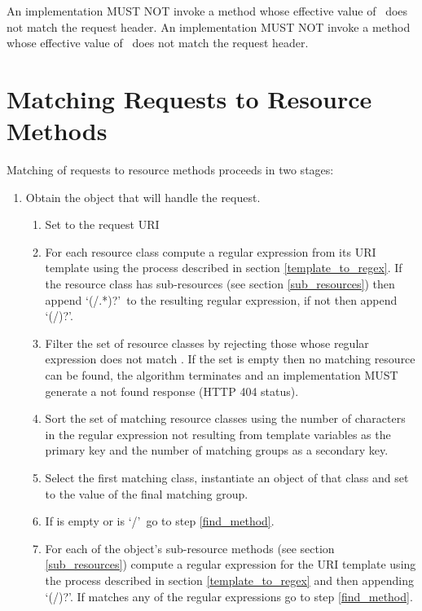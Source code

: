 An implementation MUST NOT invoke a method whose effective value of \ProduceMime\ does not match the request  header. An implementation MUST NOT invoke a method whose effective value of \ConsumeMime\ does not match the request  header.

\section{Matching Requests to Resource Methods}
\label{mapping_requests_to_java_methods}

Matching of requests to resource methods proceeds in two stages:

\begin{enumerate}
\item Obtain the object that will handle the request.

\begin{enumerate}
\item Set  to the request URI

\item For each resource class compute a regular expression from its URI template using the process described in section \ref{template_to_regex}. If the resource class has sub-resources (see section \ref{sub_resources}) then append \lq(/.*)?\rq\ to the resulting regular expression, if not then append \lq(/)?\rq.

\item Filter the set of resource classes by rejecting those whose regular expression does not match . If the set is empty then no matching resource can be found, the algorithm terminates and an implementation MUST generate a not found response (HTTP 404 status).

\item Sort the set of matching resource classes using the number of characters in the regular expression not resulting from template variables as the primary key and the number of matching groups as a secondary key.

\item Select the first matching class, instantiate an object of that class and set  to the value of the final matching group.

\item\label{check_uri} If  is empty or is \lq/\rq\ go to step \ref{find_method}.

\item For each of the object's sub-resource methods (see section \ref{sub_resources}) compute a regular expression for the URI template using the process described in section \ref{template_to_regex} and then appending \lq(/)?\rq. If  matches any of the regular expressions go to step \ref{find_method}.


\end{enumerate}
\end{enumerate}
